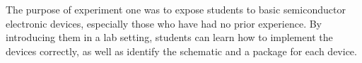 The purpose of experiment one was to expose students to basic semiconductor
electronic devices, especially those who have had no prior experience.  By
introducing them in a lab setting, students can learn how to implement the
devices correctly, as well as identify the schematic and a package for each
device.
